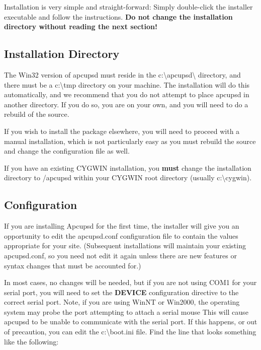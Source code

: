 {{{{{{{{{Installation is very simple and straight-forward: Simply double-click the
installer executable and follow the instructions. {\bf Do not change the
installation directory without reading the next section!}

\label{Installation-Directory}
\subsection*{Installation Directory}

\label{index-Windows_002c-Installation-Directory-172}
The Win32 version of apcupsd must reside in the
c:\textbackslash{}apcupsd\textbackslash{} directory, and there must be a
c:\textbackslash{}tmp directory on your machine. The installation will do this
automatically, and we recommend that you do not attempt to place apcupsd in
another directory. If you do so, you are on your own, and you will need to do
a rebuild of the source. 

If you wish to install the package elsewhere, you will need to proceed with a
manual installation, which is not particularly easy as you must rebuild the
source and change the configuration file as well.  

If you have an existing CYGWIN installation, you {\bf must} change the
installation directory to /apcupsd within your CYGWIN root directory
(usually c:\textbackslash{}cygwin).

\label{Configuration}
\subsection*{Configuration}

If you are installing Apcupsd for the first time, the installer will give
you an opportunity to edit the apcupsd.conf configuration file to contain
the values appropriate for your site. (Subsequent installations will
maintain your existing apcupsd.conf, so you need not edit it again unless
there are new features or syntax changes that must be accounted for.)

In most cases, no changes will be needed, but if you are not using COM1 
for your serial port, you will need to set the {\bf DEVICE} configuration
directive to the correct serial port. Note, if you are using WinNT or Win2000,
the operating system may probe the port attempting to attach a serial mouse
This will cause apcupsd to be unable to communicate with the serial port. 
If this happens, or out of precaution, you can edit the c:\textbackslash{}boot.ini
file. Find the line that looks something like the following:  

}}}}}}}}}
